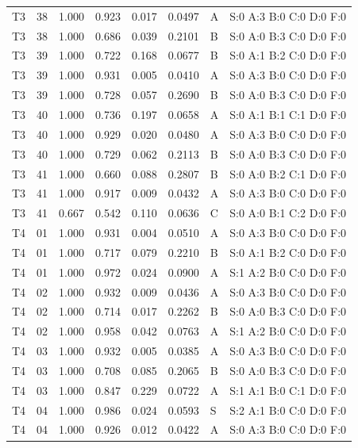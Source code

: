 \begin{longtable}{lrrrrrll}
T3 & 38 & 1.000 & 0.923 & 0.017 & 0.0497 & A & \tiny S:0 A:3 B:0 C:0 D:0 F:0 \\
T3 & 38 & 1.000 & 0.686 & 0.039 & 0.2101 & B & \tiny S:0 A:0 B:3 C:0 D:0 F:0 \\
T3 & 39 & 1.000 & 0.722 & 0.168 & 0.0677 & B & \tiny S:0 A:1 B:2 C:0 D:0 F:0 \\
T3 & 39 & 1.000 & 0.931 & 0.005 & 0.0410 & A & \tiny S:0 A:3 B:0 C:0 D:0 F:0 \\
T3 & 39 & 1.000 & 0.728 & 0.057 & 0.2690 & B & \tiny S:0 A:0 B:3 C:0 D:0 F:0 \\
T3 & 40 & 1.000 & 0.736 & 0.197 & 0.0658 & A & \tiny S:0 A:1 B:1 C:1 D:0 F:0 \\
T3 & 40 & 1.000 & 0.929 & 0.020 & 0.0480 & A & \tiny S:0 A:3 B:0 C:0 D:0 F:0 \\
T3 & 40 & 1.000 & 0.729 & 0.062 & 0.2113 & B & \tiny S:0 A:0 B:3 C:0 D:0 F:0 \\
T3 & 41 & 1.000 & 0.660 & 0.088 & 0.2807 & B & \tiny S:0 A:0 B:2 C:1 D:0 F:0 \\
T3 & 41 & 1.000 & 0.917 & 0.009 & 0.0432 & A & \tiny S:0 A:3 B:0 C:0 D:0 F:0 \\
T3 & 41 & 0.667 & 0.542 & 0.110 & 0.0636 & C & \tiny S:0 A:0 B:1 C:2 D:0 F:0 \\
T4 & 01 & 1.000 & 0.931 & 0.004 & 0.0510 & A & \tiny S:0 A:3 B:0 C:0 D:0 F:0 \\
T4 & 01 & 1.000 & 0.717 & 0.079 & 0.2210 & B & \tiny S:0 A:1 B:2 C:0 D:0 F:0 \\
T4 & 01 & 1.000 & 0.972 & 0.024 & 0.0900 & A & \tiny S:1 A:2 B:0 C:0 D:0 F:0 \\
T4 & 02 & 1.000 & 0.932 & 0.009 & 0.0436 & A & \tiny S:0 A:3 B:0 C:0 D:0 F:0 \\
T4 & 02 & 1.000 & 0.714 & 0.017 & 0.2262 & B & \tiny S:0 A:0 B:3 C:0 D:0 F:0 \\
T4 & 02 & 1.000 & 0.958 & 0.042 & 0.0763 & A & \tiny S:1 A:2 B:0 C:0 D:0 F:0 \\
T4 & 03 & 1.000 & 0.932 & 0.005 & 0.0385 & A & \tiny S:0 A:3 B:0 C:0 D:0 F:0 \\
T4 & 03 & 1.000 & 0.708 & 0.085 & 0.2065 & B & \tiny S:0 A:0 B:3 C:0 D:0 F:0 \\
T4 & 03 & 1.000 & 0.847 & 0.229 & 0.0722 & A & \tiny S:1 A:1 B:0 C:1 D:0 F:0 \\
T4 & 04 & 1.000 & 0.986 & 0.024 & 0.0593 & S & \tiny S:2 A:1 B:0 C:0 D:0 F:0 \\
T4 & 04 & 1.000 & 0.926 & 0.012 & 0.0422 & A & \tiny S:0 A:3 B:0 C:0 D:0 F:0 \\

\end{longtable}
